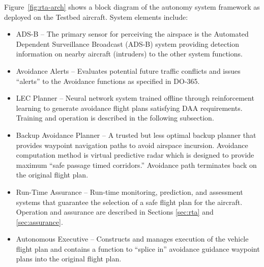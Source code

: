 Figure~\ref{fig:rta-arch} shows a block diagram of the autonomy system framework as deployed on the Testbed aircraft.
System elements include: 
\begin{itemize}
\item ADS-B – The primary sensor for perceiving the airspace is the Automated Dependent Surveillance Broadcast (ADS-B) system providing detection information on  nearby aircraft (intruders) to the other system functions.
\item Avoidance Alerts – Evaluates potential future traffic conflicts and issues “alerts” to the Avoidance functions as specified in DO-365.
\item LEC Planner -- Neural network system trained offline through reinforcement learning to generate avoidance flight plans satisfying DAA requirements.  Training and operation is described in the following subsection.  
\item Backup Avoidance Planner – A trusted but less optimal backup planner that provides waypoint navigation paths to avoid airspace incursion.  Avoidance computation method is virtual predictive radar which is designed to provide maximum ``safe passage timed corridors.''  Avoidance path terminates back on the original flight plan.
\item Run-Time Assurance  – Run-time monitoring, prediction, and assessment systems that guarantee the selection of a safe flight plan for the aircraft.  Operation and assurance are described in Sections \ref{sec:rta} and \ref{sec:assurance}.
\item Autonomous Executive – Constructs and manages execution of the vehicle flight plan and contains a function to ``splice in'' avoidance guidance waypoint plans into the original flight plan.
\end{itemize}

